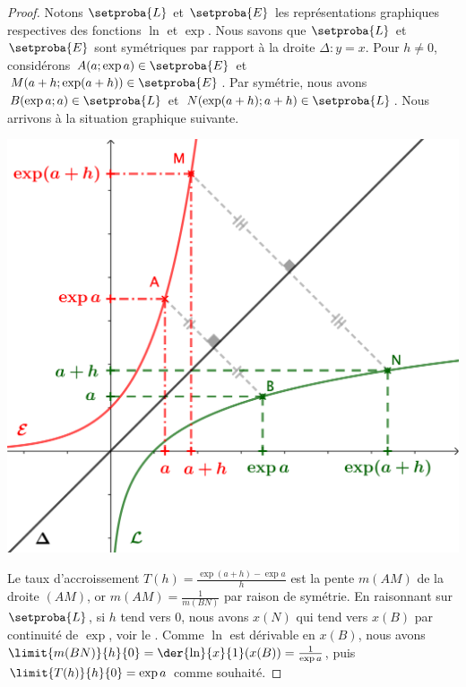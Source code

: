 \begin{proof}
	Notons $\setproba{L}$ et $\setproba{E}$ les représentations graphiques respectives des fonctions $\ln$ et $\exp$.
	Nous savons que $\setproba{L}$ et $\setproba{E}$ sont symétriques par rapport à la droite $\Delta: y = x$.
	Pour $h \neq 0$, considérons 
	$A(a ; \exp a) \in \setproba{E}$ et $M(a+h ; \exp(a+h)) \in \setproba{E}$.
	Par symétrie, nous avons
	$B(\exp a ; a) \in \setproba{L}$ et $N(\exp(a+h) ; a+h) \in \setproba{L}$.
	Nous arrivons à la situation graphique suivante.

	\begin{center}
		\includegraphics[scale=.85]{content/exp/eq-diff.png}
	\end{center}
	
	Le taux d'accroissement $T(h) = \frac{\exp(a+h) - \exp a}{h}$ est la pente $m(AM)$ de la droite $(AM)$, or $m(AM) = \frac{1}{m(BN)}$ par raison de symétrie.
	En raisonnant sur $\setproba{L}$, si $h$ tend vers $0$, nous avons $x(N)$ qui tend vers $x(B)$ par continuité de $\exp$, voir le .
	Comme $\ln$ est dérivable en $x(B)$, nous avons
	$\limit{m(BN)}{h}{0} = \der{\ln}{x}{1}(x(B)) = \frac{1}{\exp a}$,
	puis
	$\limit{T(h)}{h}{0} = \exp a$
	comme souhaité.
\end{proof}
